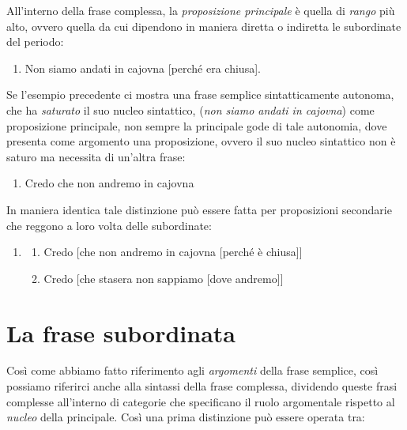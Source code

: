 \documentclass[
  a4paper,
  twoside,
  11pt,
  chapterprefix=false,
  bibliography=totocnumbered,
  listof=flat]{scrbook}
\providecommand{\tightlist}{%
  \setlength{\itemsep}{0pt}\setlength{\parskip}{0pt}}
\begin{document}
All'interno della frase complessa, la \emph{proposizione principale} è quella di \emph{rango} più alto, ovvero quella da cui dipendono in maniera diretta o indiretta le subordinate del periodo:

\begin{enumerate}
\def\labelenumi{(\arabic{enumi})}
\setcounter{enumi}{23}
\tightlist
\item
  Non siamo andati in cajovna {[}perché era chiusa{]}.
\end{enumerate}

Se l'esempio precedente ci mostra una frase semplice sintatticamente autonoma, che ha \emph{saturato} il suo nucleo sintattico, (\emph{non siamo andati in cajovna}) come proposizione principale, non sempre la principale gode di tale autonomia, dove presenta come argomento una proposizione, ovvero il suo nucleo sintattico non è saturo ma necessita di un'altra frase:

\begin{enumerate}
\def\labelenumi{(\arabic{enumi})}
\setcounter{enumi}{24}
\tightlist
\item
  Credo che non andremo in cajovna
\end{enumerate}

In maniera identica tale distinzione può essere fatta per proposizioni secondarie che reggono a loro volta delle subordinate:

\begin{enumerate}
\def\labelenumi{(\arabic{enumi})}
\setcounter{enumi}{25}
\item
  \begin{enumerate}
  \def\labelenumii{\alph{enumii}.}
  \tightlist
  \item
    Credo {[}che non andremo in cajovna {[}perché è chiusa{]}{]}
  \item
    Credo {[}che stasera non sappiamo {[}dove andremo{]}{]}
  \end{enumerate}
\end{enumerate}

\hypertarget{la-frase-subordinata}{%
\section{La frase subordinata}\label{la-frase-subordinata}}

Così come abbiamo fatto riferimento agli \emph{argomenti} della frase semplice, così possiamo riferirci anche alla sintassi della frase complessa, dividendo queste frasi complesse all'interno di categorie che specificano il ruolo argomentale rispetto al \emph{nucleo} della principale. Così una prima distinzione può essere operata tra:
\end{document}

